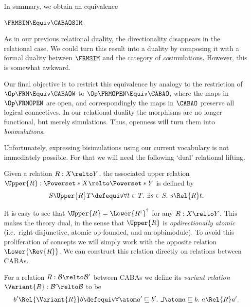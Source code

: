 \documentclass[a4paper,UKenglish,cleveref, autoref]{lipics-v2021}
\begin{document}
In summary, we obtain an equivalence

\begin{theorem}
  \label{theorem:rel-thomason}
  $
  \FRMSIM \Equiv \CABAOSIM
  $.
\end{theorem}

As in our previous relational duality, the directionality disappears in the
relational case. We could turn this result into a duality by composing it with a formal
duality between $\FRMSIM$ and the category of \emph{co}simulations. However,
this is somewhat awkward.

Our final objective is to restrict this equivalence by analogy to the
restriction of \(\Op\FRM \Equiv \CABAOW\) to \(\Op\FRMOPEN \Equiv \CABAO\),
where the maps in \(\Op\FRMOPEN\) are open, and correspondingly the maps in
\(\CABAO\) preserve all logical connectives. In our relational duality the
morphisms are no longer functional, but merely simulations. Thus, openness will
turn them into \emph{bisimulations}.

Unfortunately, expressing bisimulations using our current vocabulary is not
immediately possible. For that we will need the following `dual' relational
lifting.

\begin{definition}
  Given a relation \(R : X \relto Y\), the associated upper relation \(\Upper{R}
  : \Powerset*{X} \relto \Powerset*{Y}\) is defined by
  \[
    S \Upper{R} T \defequiv \forall t \in T.\ \exists s \in S.\ s \Rel{R} t.
  \]
\end{definition}
It is easy to see that $\Upper{R} = \Lower{R^\dagger}^\dagger$ for any $R : X \relto Y$.
This makes the theory dual, in the sense that $\Upper{R}$ is
\emph{opdirectionally atomic} (i.e.\ right-disjunctive, atomic op-founded, and an
opbimodule). To avoid this proliferation of concepts we will simply work with
the opposite relation $\Lower{\Rev{R}}$. We can construct this relation directly
on relations between CABAs. 

\begin{definition}
  For a relation \(R : \mathcal{B} \relto \mathcal{B}'\) between CABAs we define
  its \emph{variant relation} \(\Variant{R} : \mathcal{B}' \relto \mathcal{B}\)
  to be
  \[
    b' \Rel{\Variant{R}} b
    \defequiv
      \forall \atom a' \sqsubseteq b'.\
      \exists \atom a \sqsubseteq b.\
      a \Rel{R} a'.
  \]
\end{definition}
\end{document}
